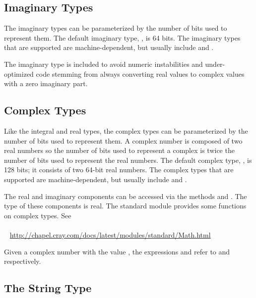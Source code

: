 \subsection{Imaginary Types}
\label{Imaginary_Types}

The imaginary types can be parameterized by the number of bits used to
represent them.  The default imaginary type, , is 64 bits.
The imaginary types that are supported are machine-dependent, but
usually include  and .

\begin{rationale}
The imaginary type is included to avoid numeric instabilities and
under-optimized code stemming from always converting real values to
complex values with a zero imaginary part.
\end{rationale}

\subsection{Complex Types}
\label{Complex_Types}

Like the integral and real types, the complex types can be
parameterized by the number of bits used to represent them.  A complex
number is composed of two real numbers so the number of bits used to
represent a complex is twice the number of bits used to represent the
real numbers.  The default complex type, , is 128 bits;
it consists of two 64-bit real numbers.  The complex types that are
supported are machine-dependent, but usually
include  and .

The real and imaginary components can be accessed via the methods
 and .  The type of these components is real.
The standard  module provides some functions on
complex types. See
\\ %
\mbox{$$ $$ $$ $$ $$} %
\url{http://chapel.cray.com/docs/latest/modules/standard/Math.html}

\begin{example}
Given a complex number  with the value , the
expressions  and  refer to 
and  respectively.
\end{example}

\subsection{The String Type}
\label{The_String_Type}

